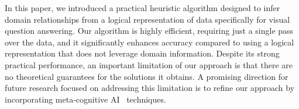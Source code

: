 In this paper, we introduced a practical heuristic algorithm designed to infer domain relationships from a logical representation of data specifically for visual question answering. Our algorithm is highly efficient, requiring just a single pass over the data, and it significantly enhances accuracy compared to using a logical representation that does not leverage domain information.
Despite its strong practical performance, an important limitation of our approach is that there are no theoretical guarantees for the solutions it obtains.
A promising direction for future research focused on addressing this limitation is to refine our approach by incorporating meta-cognitive AI~\cite{wei2024met} techniques.
    